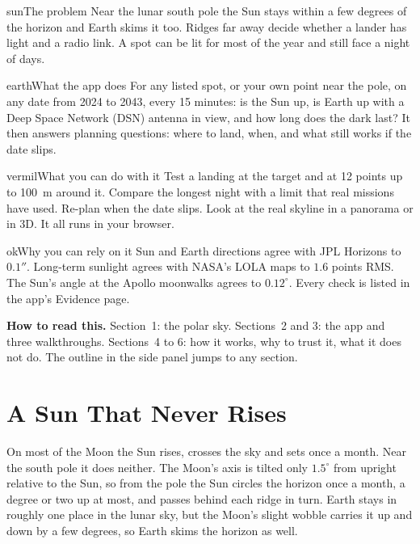 \begin{tcbraster}[raster columns=2,raster equal height=rows,raster column skip=8pt,raster row skip=8pt]
\begin{tile}{sun}{The problem}
Near the lunar south pole the Sun stays within a few degrees of the horizon and Earth skims it too. Ridges far away decide whether a lander has light and a radio link. A spot can be lit for most of the year and still face a night of days.
\end{tile}
\begin{tile}{earth}{What the app does}
For any listed spot, or your own point near the pole, on any date from 2024 to 2043, every 15 minutes: is the Sun up, is Earth up with a Deep Space Network (DSN) antenna in view, and how long does the dark last? It then answers planning questions: where to land, when, and what still works if the date slips.
\end{tile}
\begin{tile}{vermil}{What you can do with it}
Test a landing at the target and at 12 points up to 100~m around it. Compare the longest night with a limit that real missions have used. Re-plan when the date slips. Look at the real skyline in a panorama or in 3D. It all runs in your browser.
\end{tile}
\begin{tile}{ok}{Why you can rely on it}
Sun and Earth directions agree with JPL Horizons to $0.1''$. Long-term sunlight agrees with NASA's LOLA maps to $1.6$ points RMS. The Sun's angle at the Apollo moonwalks agrees to $0.12^\circ$. Every check is listed in the app's Evidence page.
\end{tile}
\end{tcbraster}

\vspace{2pt}
{\sffamily\footnotesize\color{muted}\textbf{How to read this.} Section~1: the polar sky. Sections~2 and 3: the app and three walkthroughs. Sections~4 to 6: how it works, why to trust it, what it does not do. The outline in the side panel jumps to any section.}

\section{A Sun That Never Rises}\label{sec:problem}
On most of the Moon the Sun rises, crosses the sky and sets once a month. Near the south pole it does neither. The Moon's axis is tilted only $1.5^\circ$ from upright relative to the Sun, so from the pole the Sun circles the horizon once a month, a degree or two up at most, and passes behind each ridge in turn. Earth stays in roughly one place in the lunar sky, but the Moon's slight wobble carries it up and down by a few degrees, so Earth skims the horizon as well.

